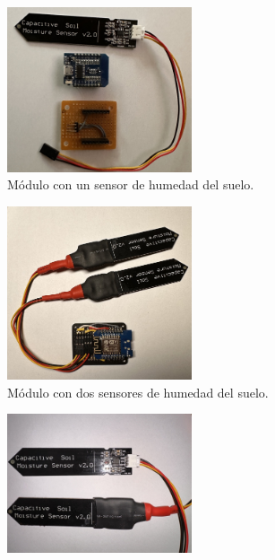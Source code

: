 \begin{figure}[!h]
     \centering
     \begin{subfigure}[b]{0.45\textwidth}
		\centering
		\includegraphics[width=0.60\textwidth]{./Figures/soil1.jpeg}
		\caption[Módulo con un sensor de humedad del suelo]{Módulo con un sensor de humedad del suelo.}
		\label{fig:soil1}
     \end{subfigure}
     \hfill
     \begin{subfigure}[b]{0.45\textwidth}
	\centering
		\includegraphics[width=0.60\textwidth]{./Figures/soil2.jpeg}
		\caption[Módulo con dos sensores de humedad del suelo]{Módulo con dos sensores de humedad del suelo.}
		\label{fig:soil2}
     \end{subfigure}
      \begin{subfigure}[b]{0.45\textwidth}
	\centering
		\includegraphics[width=0.60\textwidth]{./Figures/soil_compare.jpg}

\end{subfigure}
\end{figure}
